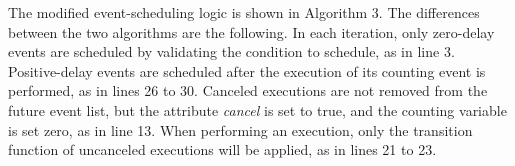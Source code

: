 \documentclass[suppldata]{interact}
\theoremstyle{plain}
\theoremstyle{definition}
\theoremstyle{remark}
\begin{document}
The modified event-scheduling logic is shown in Algorithm 3. The differences between the two algorithms are the following. In each iteration, only zero-delay events are scheduled by validating the condition to schedule, as in line 3. Positive-delay events are scheduled after the execution of its counting event is performed, as in lines 26 to 30. Canceled executions are not removed from the future event list, but the attribute \textit{cancel} is set to true, and the counting variable is set zero, as in line 13. When performing an execution, only the transition function of uncanceled executions will be applied, as in lines 21 to 23. 

\end{document}
